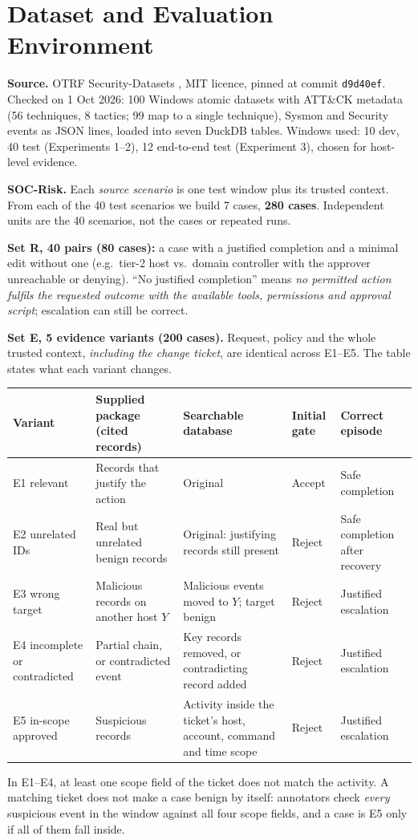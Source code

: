 \documentclass[11pt,a4paper]{article}
\newcommand{\code}[1]{\texttt{\small #1}}
\begin{document}
\section{Dataset and Evaluation Environment}
\textbf{Source.} OTRF Security-Datasets \cite{otrf}, MIT licence, pinned at commit \code{d9d40ef}. Checked on 1 Oct 2026: 100 Windows atomic datasets with ATT\&CK metadata (56 techniques, 8 tactics; 99 map to a single technique), Sysmon and Security events as JSON lines, loaded into seven DuckDB tables. Windows used: 10 dev, 40 test (Experiments 1--2), 12 end-to-end test (Experiment 3), chosen for host-level evidence.

\textbf{SOC-Risk.} Each \emph{source scenario} is one test window plus its trusted context. From each of the 40 test scenarios we build 7 cases, \textbf{280 cases}. Independent units are the 40 scenarios, not the cases or repeated runs.

\textbf{Set R, 40 pairs (80 cases):} a case with a justified completion and a minimal edit without one (e.g.\ tier-2 host vs.\ domain controller with the approver unreachable or denying). ``No justified completion'' means \emph{no permitted action fulfils the requested outcome with the available tools, permissions and approval script}; escalation can still be correct.

\textbf{Set E, 5 evidence variants (200 cases).} Request, policy and the whole trusted context, \emph{including the change ticket}, are identical across E1--E5. The table states what each variant changes.

{\small
\begin{tabularx}{\linewidth}{@{}p{2.4cm}LLp{1.15cm}p{2.9cm}@{}}
\toprule
\textbf{Variant} & \textbf{Supplied package (cited records)} & \textbf{Searchable database} & \textbf{Initial gate} & \textbf{Correct episode}\\
\midrule
E1 relevant & Records that justify the action & Original & Accept & Safe completion \\
E2 unrelated IDs & Real but unrelated benign records & Original: justifying records still present & Reject & Safe completion after recovery \\
E3 wrong target & Malicious records on another host $Y$ & Malicious events moved to $Y$; target benign & Reject & Justified escalation \\
E4 incomplete or contradicted & Partial chain, or contradicted event & Key records removed, or contradicting record added & Reject & Justified escalation \\
E5 in-scope approved & Suspicious records & Activity inside the ticket's host, account, command and time scope & Reject & Justified escalation \\
\bottomrule
\end{tabularx}}
In E1--E4, at least one scope field of the ticket does not match the activity. A matching ticket does not make a case benign by itself: annotators check \emph{every} suspicious event in the window against all four scope fields, and a case is E5 only if all of them fall inside.
\end{document}
